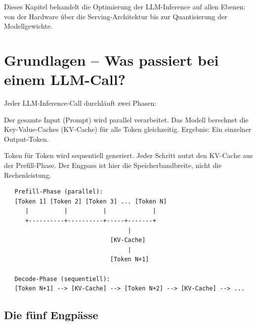 Dieses Kapitel behandelt die Optimierung der LLM-Inference auf allen Ebenen: von der Hardware über die Serving-Architektur bis zur Quantisierung der Modellgewichte.

\section{Grundlagen -- Was passiert bei einem LLM-Call?}

Jeder LLM-Inference-Call durchläuft zwei Phasen:

\begin{description}[leftmargin=*,style=nextline]
    \item[Prefill-Phase] Der gesamte Input (Prompt) wird parallel verarbeitet. Das Modell berechnet die Key-Value-Caches (KV-Cache) für alle Token gleichzeitig. Ergebnis: Ein einzelner Output-Token.
    \item[Decode-Phase] Token für Token wird sequentiell generiert. Jeder Schritt nutzt den KV-Cache aus der Prefill-Phase. Der Engpass ist hier die Speicherbandbreite, nicht die Rechenleistung.
\end{description}

\begin{verbatim}
   Prefill-Phase (parallel):
   [Token 1] [Token 2] [Token 3] ... [Token N]
      |          |          |             |
      +----------+----------+-----+-------+
                                   |
                              [KV-Cache]
                                   |
                              [Token N+1]
   
   Decode-Phase (sequentiell):
   [Token N+1] --> [KV-Cache] --> [Token N+2] --> [KV-Cache] --> ...
\end{verbatim}

\subsection{Die fünf Engpässe}

